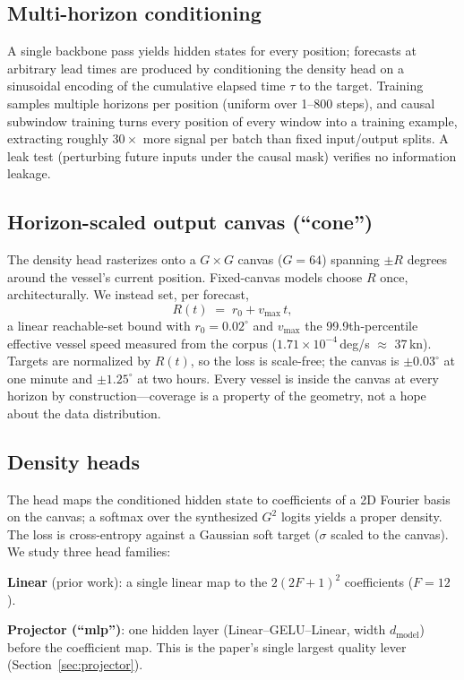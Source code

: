 \documentclass{article}
\begin{document}
\subsection{Multi-horizon conditioning}
A single backbone pass yields hidden states for every position; forecasts
at arbitrary lead times are produced by conditioning the density head on a
sinusoidal encoding of the cumulative elapsed time $\tau$ to the target.
Training samples multiple horizons per position (uniform over 1--800
steps), and causal subwindow training turns every position of every window
into a training example, extracting roughly $30\times$ more signal per
batch than fixed input/output splits. A leak test (perturbing future inputs
under the causal mask) verifies no information leakage.

\subsection{Horizon-scaled output canvas (``cone'')}
\label{sec:cone}
The density head rasterizes onto a $G \times G$ canvas ($G{=}64$) spanning
$\pm R$ degrees around the vessel's current position. Fixed-canvas models
choose $R$ once, architecturally. We instead set, per forecast,
\begin{equation}
    R(t) \;=\; r_0 + v_{\max}\, t,
\end{equation}
a linear reachable-set bound with $r_0 = 0.02^{\circ}$ and $v_{\max}$ the
99.9th-percentile effective vessel speed measured from the corpus
($1.71\times10^{-4}$\,deg/s $\approx$ 37\,kn). Targets are normalized by
$R(t)$, so the loss is scale-free; the canvas is $\pm0.03^{\circ}$ at one
minute and $\pm1.25^{\circ}$ at two hours. Every vessel is inside the
canvas at every horizon by construction---coverage is a property of the
geometry, not a hope about the data distribution.

\subsection{Density heads}
\label{sec:heads}
The head maps the conditioned hidden state to coefficients of a 2D Fourier
basis on the canvas; a softmax over the synthesized $G^2$ logits yields a
proper density. The loss is cross-entropy against a Gaussian soft target
($\sigma$ scaled to the canvas). We study three head families:

\textbf{Linear} (prior work): a single linear map to the $2(2F{+}1)^2$
coefficients ($F{=}12$).

\textbf{Projector (``mlp'')}: one hidden layer
(Linear--GELU--Linear, width $d_{\text{model}}$) before the coefficient
map. This is the paper's single largest quality lever
(Section~\ref{sec:projector}).
\end{document}
